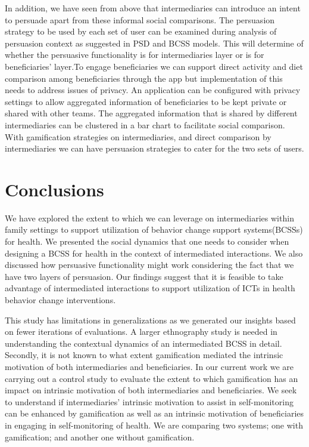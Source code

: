 \documentclass{sig-alternate}
\begin{document}
In addition, we have seen from above that intermediaries can introduce an intent to persuade apart from these informal social comparisons. The persuasion strategy to be used by each set of user can be examined during analysis of persuasion context as suggested in PSD \cite{Oinas-Kukkonen:foundation}  and BCSS \cite{Oinas-kukkonen:psd} models. This will determine of whether the persuasive functionality is for intermediaries layer or is for beneficiaries' layer.To engage beneficiaries we  can support direct activity and diet comparison among beneficiaries through the app but implementation of this needs to address issues of privacy. An application can be configured with privacy settings to allow aggregated information of beneficiaries to be kept private or shared with other teams. The aggregated information that is shared by different intermediaries can be clustered in a bar chart to facilitate social comparison. With gamification strategies on intermediaries, and direct comparison by intermediaries we can have persuasion strategies to cater for the two sets of users.

\section{Conclusions}

We have explored the extent to which we can leverage on intermediaries within
family settings to support utilization of behavior change support
systems(BCSSs) for health. We presented the social dynamics that one needs to
consider when designing a BCSS for health in the context of intermediated
interactions. We also discussed how persuasive functionality might work
considering the fact that we have two layers of persuasion. Our findings
suggest that it is feasible to take advantage of intermediated interactions to
support utilization of ICTs in health behavior change interventions.
   
This study has limitations in generalizations as we generated our insights
based on fewer iterations of evaluations. A larger ethnography study is needed
in understanding the contextual dynamics of an intermediated BCSS in detail.
Secondly, it is not known to what extent gamification mediated the intrinsic
motivation of both intermediaries and beneficiaries. In our current work we
are carrying out a control study to evaluate the extent to which gamification
has an impact on intrinsic motivation of both intermediaries and
beneficiaries. We seek to understand if intermediaries' intrinsic motivation
to assist in self-monitoring can be enhanced by gamification as well as an
intrinsic motivation of beneficiaries in engaging in self-monitoring of
health. We are comparing two systems; one with gamification; and another one
without gamification.
\end{document}
